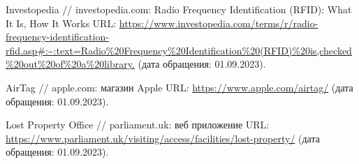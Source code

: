 \documentclass{mirea}
\begin{document}
\begin{thebibliography}{99\kern\bibindent}
	 Investopedia // investopedia.com: Radio Frequency Identification (RFID): What It Is, How It Works URL: \url{https://www.investopedia.com/terms/r/radio-frequency-identification-rfid.asp#:~:text=Radio%20Frequency%20Identification%20(RFID)%20is,checked%20out%20of%20a%20library.} (дата обращения: 01.09.2023).
	
	 AirTag // apple.com: магазин Apple URL: \url{https://www.apple.com/airtag/} (дата обращения: 01.09.2023).
	
	 Lost Property Office // parliament.uk: веб приложение URL: \url{https://www.parliament.uk/visiting/access/facilities/lost-property/} (дата обращения: 01.09.2023).
\end{thebibliography}



\appendix



	
\end{document}
